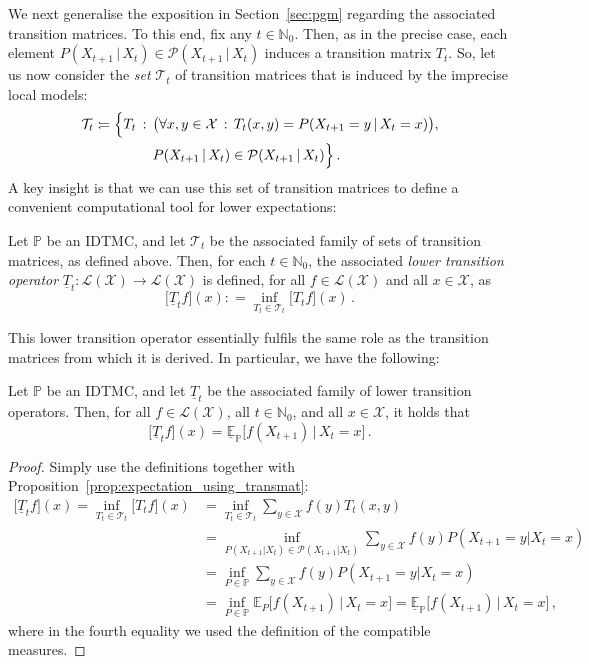 \documentclass[graybox]{svmult}
\newcommand{\nats}{\mathbb{N}}
\newcommand{\natswith}{\nats_{0}}
\newcommand{\states}{\mathcal{X}}
\newcommand{\gambles}{\mathcal{L}}
\newcommand{\gamblesX}{\gambles(\states)}
\newcommand{\coloneqq}{:\!=}
\begin{document}
We next generalise the exposition in Section~\ref{sec:pgm} regarding the associated transition matrices. To this end, fix any $t\in\natswith$. Then, as in the precise case, each element $P(X_{t+1}\,\vert\,X_t)\in\mathcal{P}(X_{t+1}\,\vert\,X_t)$ induces a transition matrix $T_t$. So, let us now consider the \emph{set} $\mathcal{T}_t$ of transition matrices that is induced by the imprecise local models:
\begin{align*}
\mathcal{T}_t \coloneqq \Bigl\{ T_t\,&:\, \bigl(\forall x,y\in\states\,:\, T_t(x,y)=P(X_{t+1}=y\,\vert\,X_t=x)\bigr), \\
 &\quad P(X_{t+1}\,\vert\,X_t)\in\mathcal{P}(X_{t+1}\,\vert\,X_t) \Bigr\}\,.
\end{align*} 
A key insight is that we can use this set of transition matrices to define a convenient computational tool for lower expectations:
\begin{definition}\label{def:lower_discrete_trans}
Let $\mathbb{P}$ be an IDTMC, and let $\mathcal{T}_t$ be the associated family of sets of transition matrices, as defined above. Then, for each $t\in\natswith$, the associated \emph{lower transition operator} $\underline{T}_t:\gamblesX\to\gamblesX$ is defined, for all $f\in\gamblesX$ and all $x\in\states$, as
\begin{equation*}
\bigl[\underline{T}_tf\bigr](x) \coloneqq \inf_{T_t\in\mathcal{T}_t}\bigl[T_tf\bigr](x)\,.
\end{equation*}
\end{definition}
This lower transition operator essentially fulfils the same role as the transition matrices from which it is derived. In particular, we have the following:
\begin{proposition}\label{prop:lower_trans_is_lower_exp}
Let $\mathbb{P}$ be an IDTMC, and let $\underline{T}_t$ be the associated family of lower transition operators. Then, for all $f\in\gamblesX$, all $t\in\natswith$, and all $x\in\states$, it holds that
\begin{equation*}
\bigl[\underline{T}_tf\bigr](x) = \underline{\mathbb{E}}_\mathbb{P}\bigl[f(X_{t+1})\,\vert\,X_t=x\bigr]\,.
\end{equation*}
\end{proposition}
\begin{proof}
Simply use the definitions together with Proposition~\ref{prop:expectation_using_transmat}:
\begin{align*}
\bigl[\underline{T}_tf\bigr](x) = \inf_{T_t\in\mathcal{T}_t} \bigl[T_tf\bigr](x) &= \inf_{T_t\in\mathcal{T}_t} \sum_{y\in\states} f(y) T_t(x,y) \\
 &= \inf_{P(X_{t+1}\vert X_t)\in\mathcal{P}(X_{t+1}\vert X_t)} \sum_{y\in\states} f(y) P(X_{t+1}=y\vert X_t=x) \\
 &= \inf_{P\in\mathbb{P}} \sum_{y\in\states} f(y) P(X_{t+1}=y\vert X_t=x) \\
 &= \inf_{P\in\mathbb{P}} \mathbb{E}_P\bigl[f(X_{t+1})\,\big\vert\,X_t=x\bigr] = \underline{\mathbb{E}}_\mathbb{P}\bigl[f(X_{t+1})\,\big\vert\,X_t=x\bigr]\,,
\end{align*}
where in the fourth equality we used the definition of the compatible measures.
\end{proof}
\end{document}

